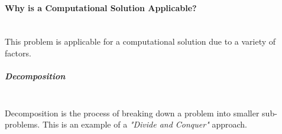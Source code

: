 \documentclass[../../../main.tex]{subfiles}
\begin{document}
\begin{comment}
why creating this solution is better with the use of technology
eg:
need a way to store large amounts of data; perfect for a database
easy way to add/remove inventory (would be labour intensive otherwise - paper based systems)
can be v. easily done with a gui

identifying key things the solution should have; explain why doing
this computationally is a good idea / is easy

1/2 a page to a page

eg decomposition/abstraction
decomp:
large program; by splitting into smaller sub-programs
can make each one individually and combine at the end
explain how they can be used to achieve the goals/impls
\end{comment}


\paragraph{Why is a Computational Solution Applicable?}

\noindent \\ This problem is applicable for a computational solution due to a variety of factors.

\subparagraph{Decomposition}

\noindent \\ Decomposition is the process of breaking down a problem into smaller sub-problems.
This is an example of a \textit{"Divide and Conquer"} approach.
\end{document}
